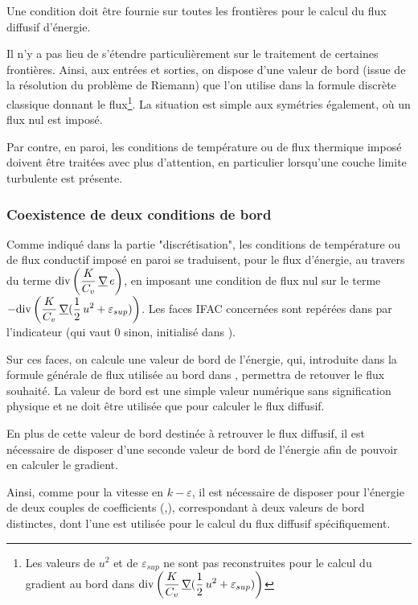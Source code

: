 Une condition doit être fournie sur toutes les frontières pour le calcul du
flux diffusif d'énergie.

Il n'y a pas lieu de
s'étendre particulièrement sur le traitement de certaines frontières.
Ainsi, aux entrées et sorties, on dispose
d'une valeur de bord (issue de la résolution du problème
de Riemann)
que l'on utilise dans la formule discrète classique donnant le
flux\footnote{Les valeurs de $u^2$ et de $\varepsilon_{sup}$ ne sont pas
reconstruites pour le calcul du gradient au bord dans
$\displaystyle\text{div}\,{\left(\frac{K}{C_v}\,\underline{\nabla}{(\frac{1}{2}\,u^2+\varepsilon_{sup})}\right)}$}.
La situation est simple aux symétries également, où un flux nul est imposé.

Par contre, en paroi, les conditions de température ou de flux thermique
imposé doivent être traitées avec plus d'attention, en particulier
lorsqu'une couche limite turbulente est présente.

\subsubsection*{Coexistence de deux conditions de bord}

Comme indiqué dans la partie "discrétisation",
les conditions de température ou de flux conductif
imposé en paroi se traduisent,
pour le flux d'énergie, au travers du terme
$\displaystyle\text{div}\,{\left(\frac{K}{C_v}\,\underline{\nabla}\,e\right)}$,
en imposant une condition de flux nul sur le terme
$\displaystyle-\text{div}\,{\left(\frac{K}{C_v}\,\underline{\nabla}{(\frac{1}{2}\,u^2+\varepsilon_{sup})}\right)}$.
Les faces IFAC
concernées sont repérées dans  par l'indicateur
 (qui vaut 0 sinon, initialisé
dans ).

Sur ces faces,
on calcule une valeur de bord de l'énergie, qui, introduite dans la
formule générale de flux utilisée au bord dans \CS, permettra de retouver le
flux souhaité. La valeur de bord est une simple valeur numérique sans
signification physique et ne doit être utilisée que pour calculer le flux
diffusif.

En plus de cette valeur de bord destinée à retrouver le
flux diffusif, il est nécessaire de disposer
d'une seconde valeur de bord de l'énergie afin de pouvoir en calculer le
gradient.

Ainsi, comme pour la vitesse en $k-\varepsilon$, il est nécessaire de
disposer pour l'énergie de deux couples de coefficients
(,), correspondant à deux valeurs de bord distinctes,
dont l'une est utilisée pour le calcul du flux diffusif spécifiquement.


